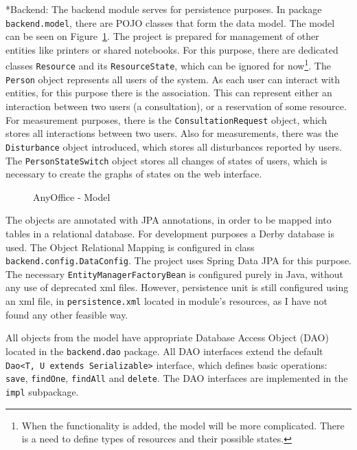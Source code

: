 \documentclass[11pt,singleside]{myfithesis2}
\makeatletter
\newcommand{\pict}[4]{
	\begin{figure}[h!]
  		\vspace{-7px}
  		\centerline{\fcolorbox{darkgray}{palegray}{\texttt{[image: \#2]}}}
  		\caption{#1}
  		\label{#4}
	\end{figure}
}
\renewcommand\paragraph{
   \vspace{-10pt}
   \@startsection{paragraph}{4}{0mm}
      {\baselineskip}
      {- 5pt}
      {\normalfont\normalsize\bfseries}
}
\makeatother
\begin{document}
\begin{sloppypar}
\paragraph*{Backend: } The backend module serves for persistence purposes. In package \texttt{backend.model}, there are POJO classes that form the data model. The model can be seen on Figure~\ref{pic:anyofficeModel}. The project is prepared for management of other entities like printers or shared notebooks. For this purpose, there are dedicated classes \texttt{Resource} and its \texttt{ResourceState}, which can be ignored for now\footnote{When the functionality is added, the model will be more complicated. There is a need to define types of resources and their possible states.}. The \texttt{Person} object represents all users of the system. As each user can interact with entities, for this purpose there is the association. This can represent either an interaction between two users (a consultation), or a reservation of some resource. For measurement purposes, there is the \texttt{ConsultationRequest} object, which stores all interactions between two users. Also for measurements, there was the \texttt{Disturbance} object introduced, which stores all disturbances reported by users. The \texttt{PersonStateSwitch} object stores all changes of states of users, which is necessary to create the graphs of states on the web interface. 
\end{sloppypar}

\pict{AnyOffice - Model}{data/model.png}{width=0.8\textwidth}{pic:anyofficeModel}

The objects are annotated with JPA annotations, in order to be mapped into tables in a relational database. For development purposes a Derby database is used. The Object Relational Mapping is configured in class \texttt{backend.config.DataConfig}. The project uses Spring Data JPA for this purpose. The necessary \texttt{EntityManagerFactoryBean} is configured purely in Java, without any use of deprecated xml files. However, persistence unit is still configured using an xml file, in \texttt{persistence.xml} located in module's resources, as I have not found any other feasible way. 

All objects from the model have appropriate Database Access Object (DAO) located in the \texttt{backend.dao} package. All DAO interfaces extend the default \texttt{Dao<T, U extends Serializable>} interface, which defines basic operations: \texttt{save}, \texttt{findOne}, \texttt{findAll} and \texttt{delete}. The DAO interfaces are implemented in the \texttt{impl} subpackage.
\end{document}
